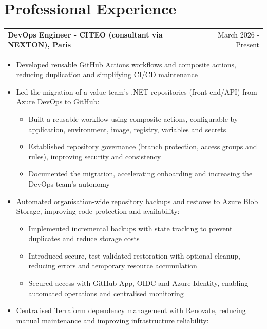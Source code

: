\documentclass[a4paper,10pt]{article}
\makeatletter
\newenvironment{joblong}[2]
    {
    \begin{tabularx}{\linewidth}{@{}l X r@{}}
    \textbf{#1} & \hfill &  #2 \\[2pt]
    \end{tabularx}
    \begin{minipage}[t]{\linewidth}
    \begin{itemize}[after=\strut, leftmargin=1em, itemsep=3pt,label=--]
    }
    {
    \end{itemize}
    \end{minipage}
    }
\makeatother
\begin{document}
\vspace{3pt}


\section{Professional Experience}

\begin{joblong}{DevOps Engineer - CITEO (consultant via NEXTON), Paris}{March 2026 - Present}
\item Developed reusable GitHub Actions workflows and composite actions, reducing duplication and simplifying CI/CD maintenance
\item Led the migration of a value team's .NET repositories (front end/API) from Azure DevOps to GitHub:
\begin{itemize}[nosep, leftmargin=1em, itemsep=0pt, label=\textbullet]
\item Built a reusable workflow using composite actions, configurable by application, environment, image, registry, variables and secrets
\item Established repository governance (branch protection, access groups and rules), improving security and consistency
\item Documented the migration, accelerating onboarding and increasing the DevOps team's autonomy
\end{itemize}
\item Automated organisation-wide repository backups and restores to Azure Blob Storage, improving code protection and availability:
\begin{itemize}[nosep, leftmargin=1em, itemsep=0pt, label=\textbullet]
\item Implemented incremental backups with state tracking to prevent duplicates and reduce storage costs
\item Introduced secure, test-validated restoration with optional cleanup, reducing errors and temporary resource accumulation
\item Secured access with GitHub App, OIDC and Azure Identity, enabling automated operations and centralised monitoring
\end{itemize}
\item Centralised Terraform dependency management with Renovate, reducing manual maintenance and improving infrastructure reliability:

\end{joblong}
\end{document}
